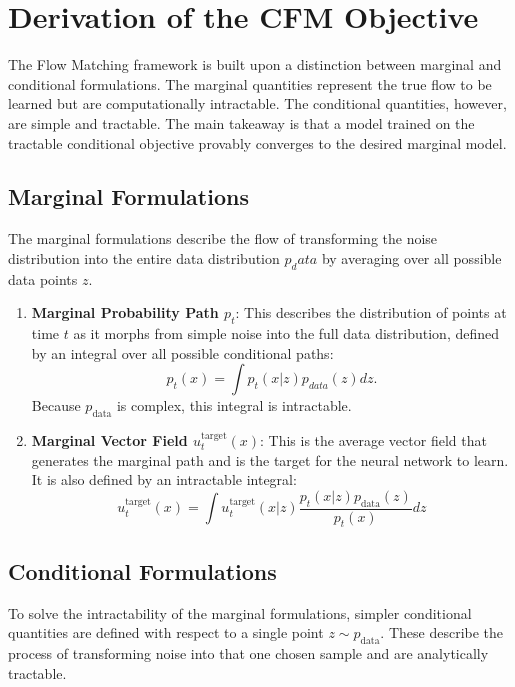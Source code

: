 \section{Derivation of the CFM Objective}
\label{app:cfm_derivation}
The Flow Matching framework is built upon a distinction between marginal and conditional formulations. The marginal quantities represent the true flow to be learned but are computationally intractable. The conditional quantities, however, are simple and tractable. The main takeaway is that a model trained on the tractable conditional objective provably converges to the desired marginal model.

\subsection{Marginal Formulations}
The marginal formulations describe the flow of transforming the noise distribution into the entire data distribution $p_data$ by averaging over all possible data points $z$.
\begin{enumerate}
	\item \textbf{Marginal Probability Path $p_t$}: This describes the distribution of points at time $t$ as it morphs from simple noise into the full data distribution, defined by an integral over all possible conditional paths:
		\begin{equation}
			p_t(x)=\int p_t(x|z)p_{data}(z)dz.
		\end{equation}
		Because $p_{\text{data}}$ is complex, this integral is intractable.
	\item \textbf{Marginal Vector Field $u_{t}^{\text{target}}(x)$}: This is the average vector field that generates the marginal path and is the target for the neural network to learn. It is also defined by an intractable integral: 
		\begin{equation}
			u_t^{\text{target}}(x) = \int u_t^{\text{target}}(x|z) \frac{p_t(x|z)p_{\text{data}}(z)}{p_t(x)} dz
		\end{equation}
\end{enumerate}

\subsection{Conditional Formulations}
To solve the intractability of the marginal formulations, simpler conditional quantities are defined with respect to a single point  $z \sim p_{\text{data}}$. These describe the process of transforming noise into that one chosen sample and are analytically tractable.

